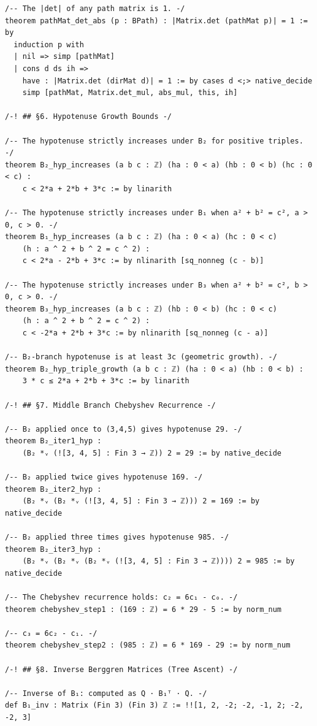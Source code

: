\documentclass[11pt,openany]{book}
\theoremstyle{definition}
\theoremstyle{plain}
\theoremstyle{remark}
\begin{document}
\begin{lstlisting}[style=lean]
/-- The |det| of any path matrix is 1. -/
theorem pathMat_det_abs (p : BPath) : |Matrix.det (pathMat p)| = 1 := by
  induction p with
  | nil => simp [pathMat]
  | cons d ds ih =>
    have : |Matrix.det (dirMat d)| = 1 := by cases d <;> native_decide
    simp [pathMat, Matrix.det_mul, abs_mul, this, ih]

/-! ## §6. Hypotenuse Growth Bounds -/

/-- The hypotenuse strictly increases under B₂ for positive triples. -/
theorem B₂_hyp_increases (a b c : ℤ) (ha : 0 < a) (hb : 0 < b) (hc : 0 < c) :
    c < 2*a + 2*b + 3*c := by linarith

/-- The hypotenuse strictly increases under B₁ when a² + b² = c², a > 0, c > 0. -/
theorem B₁_hyp_increases (a b c : ℤ) (ha : 0 < a) (hc : 0 < c)
    (h : a ^ 2 + b ^ 2 = c ^ 2) :
    c < 2*a - 2*b + 3*c := by nlinarith [sq_nonneg (c - b)]

/-- The hypotenuse strictly increases under B₃ when a² + b² = c², b > 0, c > 0. -/
theorem B₃_hyp_increases (a b c : ℤ) (hb : 0 < b) (hc : 0 < c)
    (h : a ^ 2 + b ^ 2 = c ^ 2) :
    c < -2*a + 2*b + 3*c := by nlinarith [sq_nonneg (c - a)]

/-- B₂-branch hypotenuse is at least 3c (geometric growth). -/
theorem B₂_hyp_triple_growth (a b c : ℤ) (ha : 0 < a) (hb : 0 < b) :
    3 * c ≤ 2*a + 2*b + 3*c := by linarith

/-! ## §7. Middle Branch Chebyshev Recurrence -/

/-- B₂ applied once to (3,4,5) gives hypotenuse 29. -/
theorem B₂_iter1_hyp :
    (B₂ *ᵥ (![3, 4, 5] : Fin 3 → ℤ)) 2 = 29 := by native_decide

/-- B₂ applied twice gives hypotenuse 169. -/
theorem B₂_iter2_hyp :
    (B₂ *ᵥ (B₂ *ᵥ (![3, 4, 5] : Fin 3 → ℤ))) 2 = 169 := by native_decide

/-- B₂ applied three times gives hypotenuse 985. -/
theorem B₂_iter3_hyp :
    (B₂ *ᵥ (B₂ *ᵥ (B₂ *ᵥ (![3, 4, 5] : Fin 3 → ℤ)))) 2 = 985 := by native_decide

/-- The Chebyshev recurrence holds: c₂ = 6c₁ - c₀. -/
theorem chebyshev_step1 : (169 : ℤ) = 6 * 29 - 5 := by norm_num

/-- c₃ = 6c₂ - c₁. -/
theorem chebyshev_step2 : (985 : ℤ) = 6 * 169 - 29 := by norm_num

/-! ## §8. Inverse Berggren Matrices (Tree Ascent) -/

/-- Inverse of B₁: computed as Q · B₁ᵀ · Q. -/
def B₁_inv : Matrix (Fin 3) (Fin 3) ℤ := !![1, 2, -2; -2, -1, 2; -2, -2, 3]


\end{lstlisting}
\end{document}
